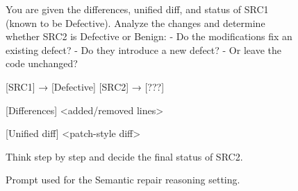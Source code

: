 \documentclass[authoryear,final,5p,times,twocolumn]{elsarticle}
\theoremstyle{plain}
\begin{document}
\begin{figure}[ht]
\centering
\begin{promptbox}
You are given the differences, unified diff, and status of SRC1 (known to be Defective). Analyze the changes and determine whether SRC2 is Defective or Benign:
- Do the modifications fix an existing defect?
- Do they introduce a new defect?
- Or leave the code unchanged?

[SRC1] → [Defective]
[SRC2] → [???]

[Differences]
\textless added/removed lines\textgreater

[Unified diff]
\textless patch-style diff\textgreater

Think step by step and decide the final status of SRC2.
\end{promptbox}
\caption{Prompt used for the Semantic repair reasoning setting.}
\label{fig:prompt_m8}
\end{figure}
\end{document}
